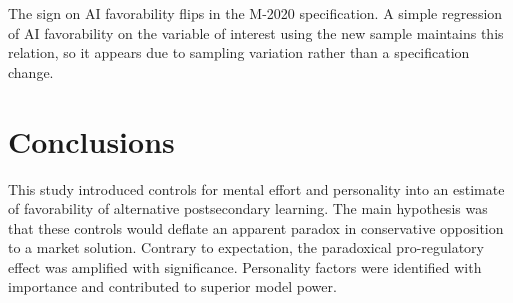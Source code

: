 \documentclass[review]{elsarticle}
\begin{document}


%



The sign on AI favorability flips in the M-2020 specification.
A simple regression of AI favorability on the variable of interest using the new sample maintains this relation,
so it appears due to sampling variation rather than a specification change.

\section{Conclusions}

This study introduced controls for mental effort and personality into an estimate of favorability of alternative postsecondary learning.
The main hypothesis was that these controls would deflate an apparent paradox in conservative opposition to a market solution.
Contrary to expectation, the paradoxical pro-regulatory effect was amplified with significance.
Personality factors were identified with importance and contributed to superior model power.
\end{document}

